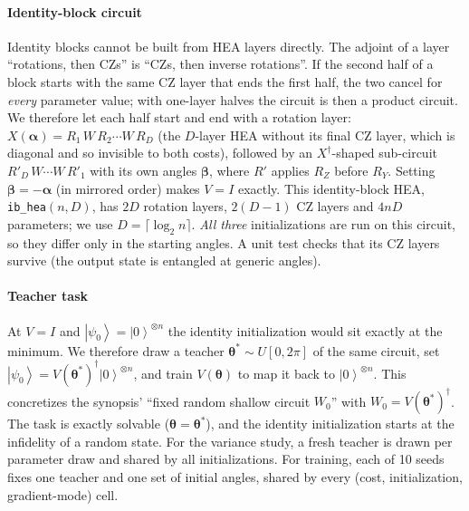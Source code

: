 \documentclass[conference]{IEEEtran}
\providecommand{\ket}[1]{\left|#1\right\rangle}
\begin{document}
\paragraph*{Identity-block circuit} Identity blocks cannot be built from
HEA layers directly. The adjoint of a layer ``rotations, then CZs'' is ``CZs,
then inverse rotations''. If the second half of a block starts with the same
CZ layer that ends the first half, the two cancel for \emph{every} parameter
value; with one-layer halves the circuit is then a product circuit. We
therefore let each half start and end with a rotation layer:
$X(\boldsymbol\alpha)=R_1\,W\,R_2\cdots W\,R_D$ (the $D$-layer HEA without its
final CZ layer, which is diagonal and so invisible to both costs), followed by
an $X^\dagger$-shaped sub-circuit $R'_D\,W\cdots W\,R'_1$ with its own angles
$\boldsymbol\beta$, where $R'$ applies $R_Z$ before $R_Y$. Setting
$\boldsymbol\beta=-\boldsymbol\alpha$ (in mirrored order) makes $V=I$ exactly.
This identity-block HEA, \texttt{ib\_hea}$(n,D)$, has $2D$ rotation layers,
$2(D-1)$ CZ layers and $4nD$ parameters; we use $D=\lceil\log_2 n\rceil$.
\emph{All three} initializations are run on this circuit, so they differ only
in the starting angles. A unit test checks that its CZ layers survive (the
output state is entangled at generic angles).

\paragraph*{Teacher task} At $V=I$ and $\ket{\psi_0}=\ket{0}^{\otimes n}$ the
identity initialization would sit exactly at the minimum. We therefore draw a
teacher $\boldsymbol\theta^*\sim U[0,2\pi]$ of the same circuit, set
$\ket{\psi_0}=V(\boldsymbol\theta^*)^\dagger\ket{0}^{\otimes n}$, and train
$V(\boldsymbol\theta)$ to map it back to $\ket{0}^{\otimes n}$. This
concretizes the synopsis' ``fixed random shallow circuit $W_0$'' with
$W_0=V(\boldsymbol\theta^*)^\dagger$. The task is exactly solvable
($\boldsymbol\theta=\boldsymbol\theta^*$), and the identity initialization starts
at the infidelity of a random state. For the variance study, a fresh teacher is
drawn per parameter draw and shared by all initializations. For training, each
of 10 seeds fixes one teacher and one set of initial angles, shared by every
(cost, initialization, gradient-mode) cell.
\end{document}
